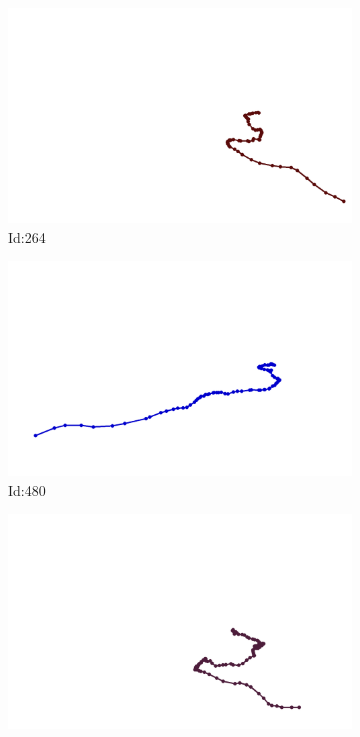 \documentclass[12pt,twoside]{report}
\begin{document}
\begin{figure}
\centering
\begin{subfigure}[b]{0.20\textwidth}
\centering
\includegraphics[width=\textwidth]{../../trajectories/264.png}
\caption{Id:264}
\end{subfigure}
\begin{subfigure}[b]{0.20\textwidth}
\centering
\includegraphics[width=\textwidth]{../../trajectories/480.png}
\caption{Id:480}
\end{subfigure}
\begin{subfigure}[b]{0.20\textwidth}
\centering
\includegraphics[width=\textwidth]{../../trajectories/522.png}

\end{subfigure}
\end{figure}
\end{document}
